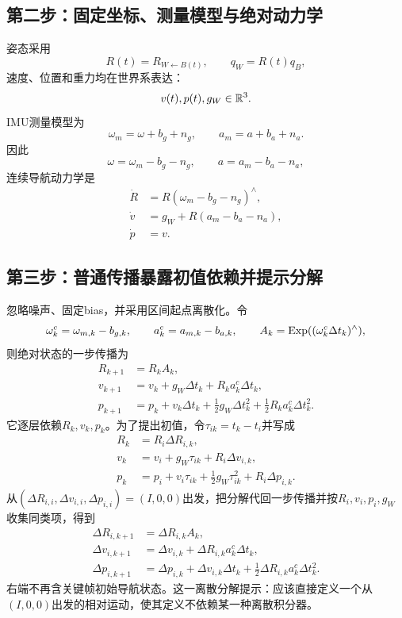 \subsection*{第二步：固定坐标、测量模型与绝对动力学}

姿态采用
\[
    R(t)=R_{W\leftarrow B(t)},
    \qquad
    q_W=R(t)q_B,
\]
速度、位置和重力均在世界系表达：
\[
    v(t),p(t),g_W\in\mathbb{R}^3.
\]
IMU测量模型为
\[
    \omega_m=\omega+b_g+n_g,
    \qquad
    a_m=a+b_a+n_a.
\]
因此
\[
    \omega=\omega_m-b_g-n_g,
    \qquad
    a=a_m-b_a-n_a,
\]
连续导航动力学是
\[
\boxed{
\begin{aligned}
    \dot R&=R(\omega_m-b_g-n_g)^\wedge,\\
    \dot v&=g_W+R(a_m-b_a-n_a),\\
    \dot p&=v.
\end{aligned}
}
\]

\subsection*{第三步：普通传播暴露初值依赖并提示分解}

忽略噪声、固定bias，并采用区间起点离散化。令
\[
    \omega_k^c=\omega_{m,k}-b_{g,k},
    \qquad
    a_k^c=a_{m,k}-b_{a,k},
    \qquad
    A_k=\operatorname{Exp}((\omega_k^c\Delta t_k)^\wedge),
\]
则绝对状态的一步传播为
\[
\begin{aligned}
    R_{k+1}&=R_kA_k,\\
    v_{k+1}&=v_k+g_W\Delta t_k+R_ka_k^c\Delta t_k,\\
    p_{k+1}&=p_k+v_k\Delta t_k
      +\frac12g_W\Delta t_k^2
      +\frac12R_ka_k^c\Delta t_k^2.
\end{aligned}
\]
它逐层依赖$R_k,v_k,p_k$。为了提出初值，令$\tau_{ik}=t_k-t_i$并写成
\[
\begin{aligned}
    R_k&=R_i\Delta R_{i,k},\\
    v_k&=v_i+g_W\tau_{ik}+R_i\Delta v_{i,k},\\
    p_k&=p_i+v_i\tau_{ik}
      +\frac12g_W\tau_{ik}^2+R_i\Delta p_{i,k}.
\end{aligned}
\]
从$(\Delta R_{i,i},\Delta v_{i,i},\Delta p_{i,i})=(I,0,0)$出发，把分解代回一步传播并按$R_i,v_i,p_i,g_W$收集同类项，得到
\[
\boxed{
\begin{aligned}
    \Delta R_{i,k+1}
    &=\Delta R_{i,k}A_k,\\
    \Delta v_{i,k+1}
    &=\Delta v_{i,k}+\Delta R_{i,k}a_k^c\Delta t_k,\\
    \Delta p_{i,k+1}
    &=\Delta p_{i,k}+\Delta v_{i,k}\Delta t_k
      +\frac12\Delta R_{i,k}a_k^c\Delta t_k^2.
\end{aligned}
}
\]
右端不再含关键帧初始导航状态。这一离散分解提示：应该直接定义一个从$(I,0,0)$出发的相对运动，使其定义不依赖某一种离散积分器。

